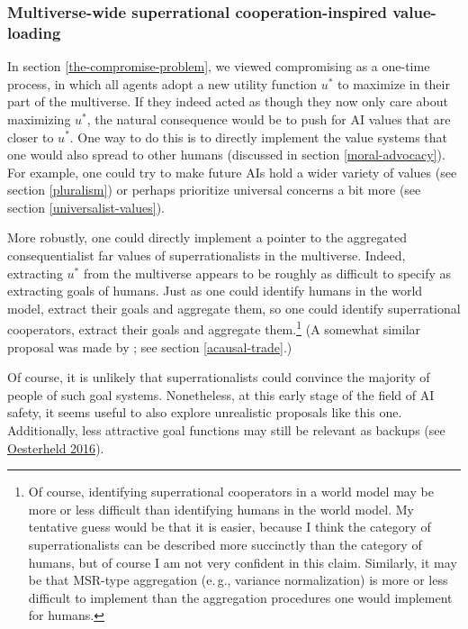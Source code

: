 \subsubsection{Multiverse-wide superrational cooperation-inspired
value-loading}\label{multiverse-wide-superrational-cooperation-inspired-value-loading}

In section \ref{the-compromise-problem}, we viewed compromising as a one-time process, in
which all agents adopt a new utility function \(u^{*}\) to maximize in
their part of the multiverse. If they indeed acted as though they now
only care about maximizing \(u^{*}\), the natural consequence would be
to push for AI values that are closer to \(u^{*}\). One way to do this
is to directly implement the value systems that one would also spread to
other humans (discussed in section
\ref{moral-advocacy}). For
example, one could try to make future AIs hold a wider variety of values
(see section \ref{pluralism}) or
perhaps prioritize universal concerns a bit more (see section
\ref{universalist-values}).

More robustly, one could directly implement a pointer to the aggregated
consequentialist far values of superrationalists in the multiverse.
Indeed, extracting \(u^{*}\) from the multiverse appears to be roughly
as difficult to specify as extracting goals of humans. Just as one could
identify humans in the world model, extract their goals and aggregate
them, so one could identify superrational cooperators, extract their
goals and aggregate them.\footnote{Of course, identifying superrational
  cooperators in a world model may be more or less difficult than
  identifying humans in the world model. My tentative guess would be
  that it is easier, because I think the category of superrationalists
  can be described more succinctly than the category of humans, but of
  course I am not very confident in this claim. Similarly, it may be
  that MSR-type aggregation (e.\,g., variance normalization) is more or
  less difficult to implement than the aggregation procedures one would
  implement for humans.} (A somewhat similar proposal was made by 
  \citet[page 14]{Bostrom2014-gy}; see section
\ref{acausal-trade}.)

Of course, it is unlikely that superrationalists could convince the
majority of people of such goal systems. Nonetheless, at this early
stage of the field of AI safety, it seems useful to also explore
unrealistic proposals like this one. Additionally, less attractive goal
functions may still be relevant as backups (see
\href{https://foundational-research.org/files/backup-utility-functions.pdf}{Oesterheld
2016}).


